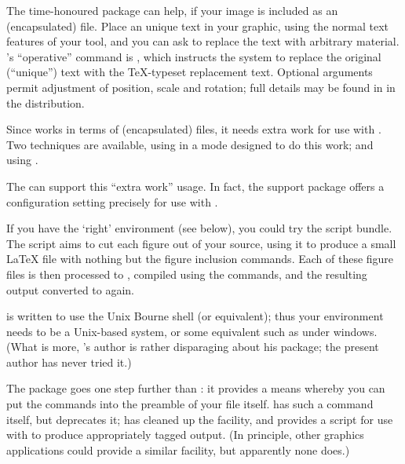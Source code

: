 The time-honoured  package can help, if your image is
included as an (encapsulated) \PS{} file.  Place an unique
text in your graphic, using the normal text features of your tool, and
you can ask  to replace the text with arbitrary
\AllTeX{} material.  's ``operative'' command is
, which
instructs the system to replace the original (``unique'') text with
the \TeX{}-typeset replacement text.  Optional arguments permit
adjustment of position, scale and rotation; full details may be found
in  in the distribution.

Since  works in terms of (encapsulated) \PS{} files,
it needs extra work for use with \PDFLaTeX{}.  Two techniques are
available, using 
in a mode designed to do this work; and using .

The  can support
this ``extra work'' usage.  In fact, the  support
package  offers a configuration setting
precisely for use with .

If you have the `right' environment (see below), you could try the
 script bundle.  The script aims to cut each figure
out of your source, using it to produce a small \LaTeX{} file with
nothing but the figure inclusion commands.  Each of these figure files
is then processed to \PS{}, compiled using the  commands,
and the resulting output converted to  again.

 is written to use the Unix Bourne shell (or
equivalent); thus your environment needs to be a Unix-based system, or
some equivalent such as  under windows.  (What is
more, 's author is rather disparaging about his
package; the present author has never tried it.)

The  package goes one step further than
: it provides a means whereby you can put the
 commands into the preamble of your  file
itself.   has such a command itself, but deprecates
it;  has cleaned up the facility, and provides a
script  for use with  to produce
appropriately tagged output.  (In principle, other graphics
applications could provide a similar facility, but apparently none does.)

